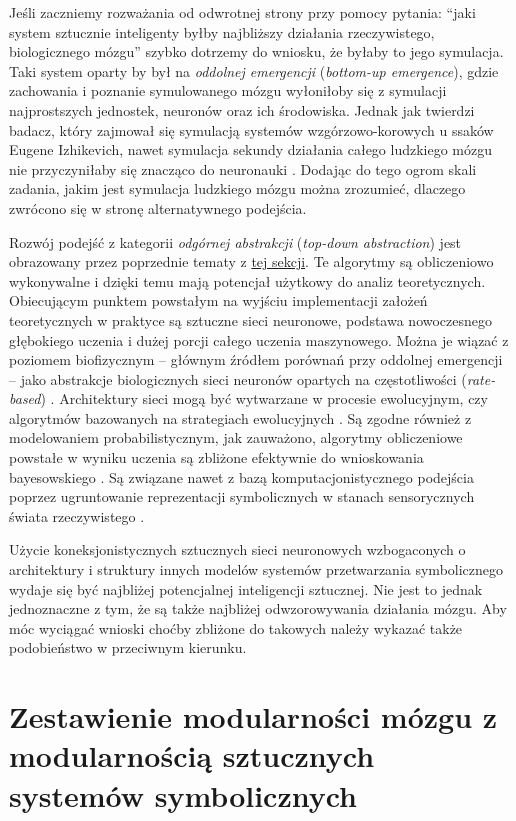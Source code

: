 Jeśli zaczniemy rozważania od odwrotnej strony przy pomocy pytania: ``jaki system sztucznie inteligenty byłby najbliższy działania rzeczywistego, biologicznego mózgu'' szybko dotrzemy do wniosku, że byłaby to jego symulacja.
Taki system oparty by był na \emph{oddolnej emergencji} (\emph{bottom-up emergence}), gdzie zachowania i poznanie symulowanego mózgu wyłoniłoby się z symulacji najprostszych jednostek, neuronów oraz ich środowiska.
Jednak jak twierdzi badacz, który zajmował się symulacją systemów wzgórzowo-korowych u ssaków \cite{izhikevich2008large} Eugene Izhikevich, nawet symulacja sekundy działania całego ludzkiego mózgu nie przyczyniłaby się znacząco do neuronauki \cite{Izhikevich2006why}.
Dodając do tego ogrom skali zadania, jakim jest symulacja ludzkiego mózgu można zrozumieć, dlaczego zwrócono się w stronę alternatywnego podejścia.

Rozwój podejść z kategorii \emph{odgórnej abstrakcji} (\emph{top-down abstraction}) jest obrazowany przez poprzednie tematy z \hyperref[cognitive-basics]{tej sekcji}.
Te algorytmy są obliczeniowo wykonywalne i dzięki temu mają potencjał użytkowy do analiz teoretycznych.
Obiecującym punktem powstałym na wyjściu implementacji założeń teoretycznych w praktyce są sztuczne sieci neuronowe, podstawa nowoczesnego głębokiego uczenia i dużej porcji całego uczenia maszynowego.
Można je wiązać z poziomem biofizycznym -- głównym źródłem porównań przy oddolnej emergencji -- jako abstrakcje biologicznych sieci neuronów opartych na częstotliwości (\emph{rate-based}) \cite{dayan2001theoretical}.
Architektury sieci mogą być wytwarzane w procesie ewolucyjnym, czy algorytmów bazowanych na strategiach ewolucyjnych \cite{real2017large}.
Są zgodne również z modelowaniem probabilistycznym, jak zauważono, algorytmy obliczeniowe powstałe w wyniku uczenia są zbliżone efektywnie do wnioskowania bayesowskiego \cite{gal2016dropout, mandt2017stochastic}.
Są związane nawet z bazą komputacjonistycznego podejścia poprzez ugruntowanie reprezentacji symbolicznych w stanach sensorycznych świata rzeczywistego \cite{harnad1990symbol}.

Użycie koneksjonistycznych sztucznych sieci neuronowych wzbogaconych o architektury i struktury innych modelów systemów przetwarzania symbolicznego wydaje się być najbliżej potencjalnej inteligencji sztucznej.
Nie jest to jednak jednoznaczne z tym, że są także najbliżej odwzorowywania działania mózgu.
Aby móc wyciągać wnioski choćby zbliżone do takowych należy wykazać także podobieństwo w przeciwnym kierunku.

\section{Zestawienie modularności mózgu z modularnością sztucznych systemów symbolicznych}


